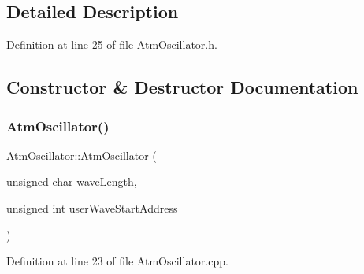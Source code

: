 \subsection{Detailed Description}


Definition at line 25 of file Atm\+Oscillator.\+h.



\subsection{Constructor \& Destructor Documentation}
\mbox{\label{class_atm_oscillator_a864b35c83864a6d5045f9dbb42fa862e}} 
\subsubsection{\texorpdfstring{Atm\+Oscillator()}{AtmOscillator()}}
{\footnotesize\ttfamily Atm\+Oscillator\+::\+Atm\+Oscillator (\begin{DoxyParamCaption}\item[{unsigned char}]{wave\+Length,  }\item[{unsigned int}]{user\+Wave\+Start\+Address }\end{DoxyParamCaption})}



Definition at line 23 of file Atm\+Oscillator.\+cpp.

